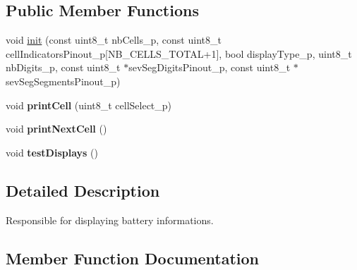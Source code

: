 \subsection*{Public Member Functions}
\begin{DoxyCompactItemize}
\item 
void \hyperlink{class_plane_battery_bisplay_aaa5bb0ec5fd6c31febf211dc1c10273b}{init} (const uint8\+\_\+t nb\+Cells\+\_\+p, const uint8\+\_\+t cell\+Indicators\+Pinout\+\_\+p\mbox{[}N\+B\+\_\+\+C\+E\+L\+L\+S\+\_\+\+T\+O\+T\+AL+1\mbox{]}, bool display\+Type\+\_\+p, uint8\+\_\+t nb\+Digits\+\_\+p, const uint8\+\_\+t $\ast$sev\+Seg\+Digits\+Pinout\+\_\+p, const uint8\+\_\+t $\ast$sev\+Seg\+Segments\+Pinout\+\_\+p)
\item 
\mbox{\label{class_plane_battery_bisplay_a2e5a1c0a536c707a2d02562210fa8d67}} 
void {\bfseries print\+Cell} (uint8\+\_\+t cell\+Select\+\_\+p)
\item 
\mbox{\label{class_plane_battery_bisplay_ae3c48c207bc32d8b76b7d5790574de60}} 
void {\bfseries print\+Next\+Cell} ()
\item 
\mbox{\label{class_plane_battery_bisplay_a1d55cf98e2230b5e19345c6243c5b9be}} 
void {\bfseries test\+Displays} ()
\end{DoxyCompactItemize}


\subsection{Detailed Description}
Responsible for displaying battery informations. 

\subsection{Member Function Documentation}
\mbox{\label{class_plane_battery_bisplay_aaa5bb0ec5fd6c31febf211dc1c10273b}} 
